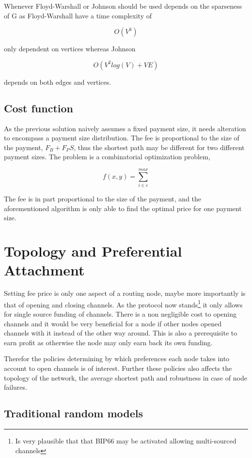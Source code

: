 Whenever Floyd-Warshall or Johnson should be used depends on the sparseness of G as Floyd-Warshall have a time complexity of

\[ O(V^3) \]

only dependent on vertices whereas Johnson

\[ O(V^2 log(V) + VE ) \]

depends on both edges and vertices. 

\subsection{Cost function}

As the previous solution naively assumes a fixed payment size, it needs alteration to encompass a payment size distribution.
The fee is proportional to the size of the payment, $F_B + F_P S$, thus the shortest path may be different for two different payment sizes. 
The problem is a combinatorial optimization problem,

\[ f(x, y) = \sum_{i \in e}^{max} \]



The fee is in part proportional to the size of the payment, and the aforementioned algorithm is only able to find the optimal price for one payment size.

 

\section{Topology and Preferential Attachment}

Setting fee price is only one aspect of a routing node, maybe more importantly is that of opening and closing channels.
As the protocol now stands\footnote{Is very plausible that that BIP66 may be activated allowing multi-sourced channels\cite{bip:0118:sighash:noinput}} it only allows for single source funding of channels. There is a non negligible cost to opening channels and it would be very beneficial for a node if other nodes opened channels with it instead of the other way around. This is also a prerequisite to earn profit as otherwise the node may only earn back its own funding. 

Therefor the policies determining by which preferences each node takes into account to open channels is of interest. Further these policies also affects the topology of the network, the average shortest path and robustness in case of node failures.

\subsection{Traditional random models}

